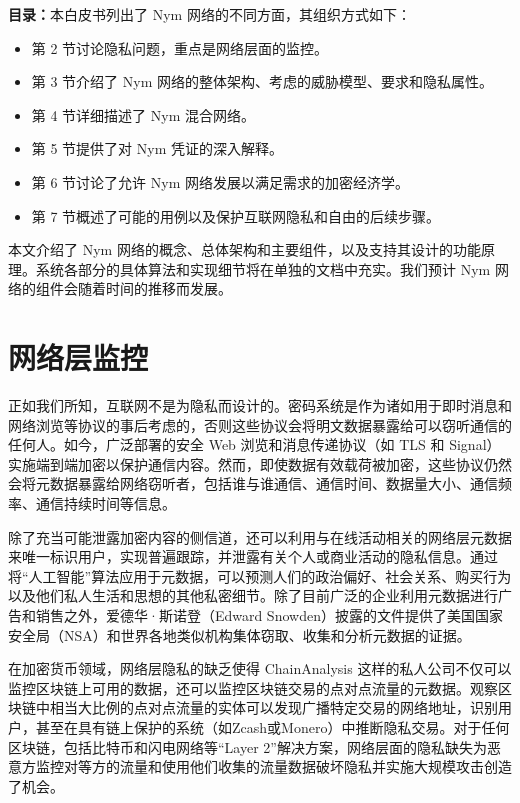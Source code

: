 \documentclass{article}
\begin{document}
\textbf{目录：}本白皮书列出了 Nym 网络的不同方面，其组织方式如下：

\begin{itemize}
\item 第 2 节讨论隐私问题，重点是网络层面的监控。
\item 第 3 节介绍了 Nym 网络的整体架构、考虑的威胁模型、要求和隐私属性。
\item 第 4 节详细描述了 Nym 混合网络。
\item 第 5 节提供了对 Nym 凭证的深入解释。
\item 第 6 节讨论了允许 Nym 网络发展以满足需求的加密经济学。
\item 第 7 节概述了可能的用例以及保护互联网隐私和自由的后续步骤。
\end{itemize}

	本文介绍了 Nym 网络的概念、总体架构和主要组件，以及支持其设计的功能原理。系统各部分的具体算法和实现细节将在单独的文档中充实。我们预计 Nym 网络的组件会随着时间的推移而发展。\newline
	
	\section{网络层监控}
	
	正如我们所知，互联网不是为隐私而设计的。密码系统是作为诸如用于即时消息和网络浏览等协议的事后考虑的，否则这些协议会将明文数据暴露给可以窃听通信的任何人。如今，广泛部署的安全 Web 浏览和消息传递协议（如 TLS 和 Signal）实施端到端加密以保护通信内容。然而，即使数据有效载荷被加密，这些协议仍然会将元数据暴露给网络窃听者，包括谁与谁通信、通信时间、数据量大小、通信频率、通信持续时间等信息。\newline

	除了充当可能泄露加密内容的侧信道\cite{ref21, ref63, ref84, ref98}，还可以利用与在线活动相关的网络层元数据来唯一标识用户，实现普遍跟踪，并泄露有关个人或商业活动的隐私信息\cite{ref39, ref51, ref79}。通过将“人工智能”算法应用于元数据，可以预测人们的政治偏好、社会关系、购买行为以及他们私人生活和思想的其他私密细节\cite{ref77}。除了目前广泛的企业利用元数据进行广告和销售之外，爱德华·斯诺登（Edward Snowden）披露的文件提供了美国国家安全局（NSA）和世界各地类似机构集体窃取、收集和分析元数据的证据\cite{ref77}。\newline

	在加密货币领域，网络层隐私的缺乏使得 ChainAnalysis 这样的私人公司不仅可以监控区块链上可用的数据，还可以监控区块链交易的点对点流量的元数据\cite{ref22}。观察区块链中相当大比例的点对点流量的实体可以发现广播特定交易的网络地址，识别用户，甚至在具有链上保护的系统（如Zcash或Monero）中推断隐私交易\cite{ref6, ref92}。对于任何区块链，包括比特币和闪电网络等“Layer 2”解决方案，网络层面的隐私缺失为恶意方监控对等方的流量和使用他们收集的流量数据破坏隐私并实施大规模攻击创造了机会\cite{ref34, ref53}。\newline
\end{document}
